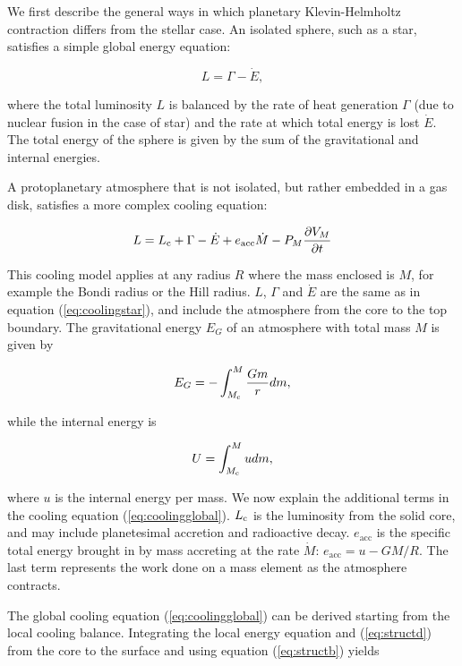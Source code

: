 \documentclass[apj]{emulateapj}
\newcommand{\co}{_{\rm c}}
\begin{document}
We first describe the general ways in which planetary Klevin-Helmholtz contraction differs from the stellar case. An isolated sphere, such as a star, satisfies a simple global energy equation:

\begin{equation}
\label{eq:coolingstar}
L=\Gamma - \dot{E},
\end{equation}

\noindent where the total luminosity $L$ is balanced by the rate of heat generation $\Gamma$ (due to nuclear fusion in the case of star) and the rate at which total energy is lost $\dot{E}$. The total energy of the sphere is given by the sum of the gravitational and internal energies. 

A protoplanetary atmosphere that is not isolated, but rather embedded in a gas disk, satisfies a more complex cooling equation:

\begin{equation}
\label{eq:coolingglobal}
L=L\co+\Gamma-\dot{E}+e_{\mathrm{acc}}\dot{M}-P_M \frac{\partial V_M}{\partial t}
\end{equation}

This cooling model applies at any radius $R$ where the mass enclosed is $M$, for example the Bondi radius or the Hill radius. $L$, $\Gamma$ and $\dot{E}$ are the same as in equation (\ref{eq:coolingstar}), and include the atmosphere from the core to the top boundary. The gravitational energy $E_G$ of an atmosphere with total mass $M$ is given by 

\begin{equation}
\label{eq:Eg}
E_G=-\int_{M\co}^M \frac{G m}{r} dm,
\end{equation}

\noindent while the internal energy is 

\begin{equation}
\label{eq:U}
U=\int_{M\co}^M u dm,
\end{equation}

\noindent where $u$ is the internal energy per mass. We now explain the additional terms in the cooling equation (\ref{eq:coolingglobal}). $L\co$ is the luminosity from the solid core, and may include planetesimal accretion and radioactive decay. $e_{\mathrm{acc}}$ is the specific total energy brought in by mass accreting at the rate $\dot{M}$: $e_{\mathrm{acc}}=u-G M/R$. The last term represents the work done on a mass element as the atmosphere contracts. 

The global cooling equation (\ref{eq:coolingglobal}) can be derived starting from the local cooling balance. Integrating the local energy equation and (\ref{eq:structd}) from the core to the surface and using equation (\ref{eq:structb}) yields
\end{document}
